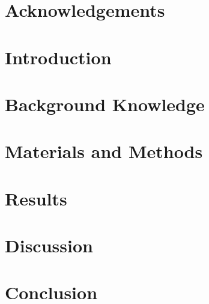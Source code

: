 \documentclass[12pt]{report}
\begin{document}

% 

\chapter*{Acknowledgements}


\begin{abstract}
\thispagestyle{plain}
\setcounter{page}{2}


\end{abstract}

\setcounter{page}{3}
\tableofcontents{}
\listoffigures
\listoftables

\chapter{Introduction}
\setcounter{page}{1}
\label{chapter:Introduction}


\chapter{Background Knowledge}
\label{chapter:Back_Knowledge}


\chapter{Materials and Methods}
\label{chapter:MatsAndMethds}


\chapter{Results}
\label{chapter:Results}


\chapter{Discussion}
\label{chapter:Discussion}


\chapter{Conclusion}
\label{chapter:Conclusion}


\printbibliography

%

%
\end{document}
